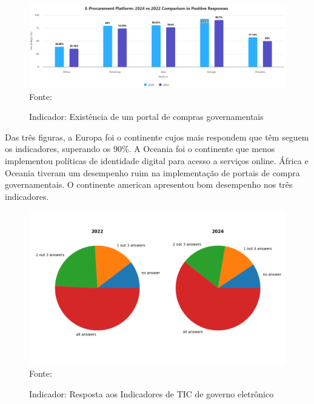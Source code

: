 \begin{figure}[H]
	\centering
	\caption{Indicador: Existência de um portal de compras governamentais}
	\includegraphics[width=1\linewidth]{figuras/ict_in_government/procurement_portal}
	\label{fig:procurement_portal}
	\footnotesize{Fonte: \cite{ONU_ICT_in_government_indicators}}
\end{figure}

Das três figuras, a Europa foi o continente cujos mais respondem que têm seguem os indicadores, superando os 90\%. A Oceania foi o continente que menos implementou políticas de identidade digital para acesso a serviços online. África e Oceania tiveram um desempenho ruim na implementação de portais de compra governamentais. O continente american apresentou bom desempenho nos três indicadores.

\begin{figure}[H]
	\centering
	\caption{Indicador: Resposta aos Indicadores de TIC de governo eletrônico}
	\includegraphics[width=1\linewidth]{figuras/ict_in_government/indicators_answer.png}
	\label{fig:indicators_answer}
	\footnotesize{Fonte: \cite{ONU_ICT_in_government_indicators}}
\end{figure}